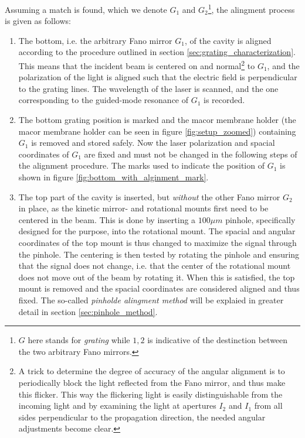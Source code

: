 Assuming a match is found, which we denote $G_1$ and $G_2$\footnote{$G$ here stands for \emph{grating} while $1,2$ is indicative of the destinction between the two arbitrary Fano mirrors.}, the alingment process is given as follows: 
\begin{enumerate}
    \item The bottom, i.e. the arbitrary Fano mirror $G_1$, of the cavity is aligned according to the procedure outlined in section \ref{sec:grating_characterization}. This means that the incident beam is centered on and normal\footnote{A trick to determine the degree of accuracy of the angular alignment is to periodically block the light reflected from the Fano mirror, and thus make this flicker. This way the flickering light is easily distinguishable from the incoming light and by examining the light at apertures $I_2$ and $I_1$ from all sides perpendicular to the propagation direction, the needed angular adjustments become clear.} to $G_1$, and the polarization of the light is aligned such that the electric field is perpendicular to the grating lines. The wavelength of the laser is scanned, and the one corresponding to the guided-mode resonance of $G_1$ is recorded.  
    \item The bottom grating position is marked and the macor membrane holder (the macor membrane holder can be seen in figure \ref{fig:setup_zoomed}) containing $G_1$ is removed and stored safely. Now the laser polarization and spacial coordinates of $G_1$ are fixed and must not be changed in the following steps of the alignment procedure. The marks used to indicate the position of $G_1$ is shown in figure \ref{fig:bottom_with_alginment_mark}.
    \item The top part of the cavity is inserted, but \emph{without} the other Fano mirror $G_2$ in place, as the kinetic mirror- and rotational mounts first need to be centered in the beam. This is done by inserting a $100 \mu m$ pinhole, specifically designed for the purpose, into the rotational mount. The spacial and angular coordinates of the top mount is thus changed to maximize the signal through the pinhole. The centering is then tested by rotating the pinhole and ensuring that the signal does not change, i.e. that the center of the rotational mount does not move out of the beam by rotating it. When this is satisfied, the top mount is removed and the spacial coordinates are considered aligned and thus fixed. The so-called \emph{pinholde alingment method} will be explaied in greater detail in section \ref{sec:pinhole_method}.

\end{enumerate}
